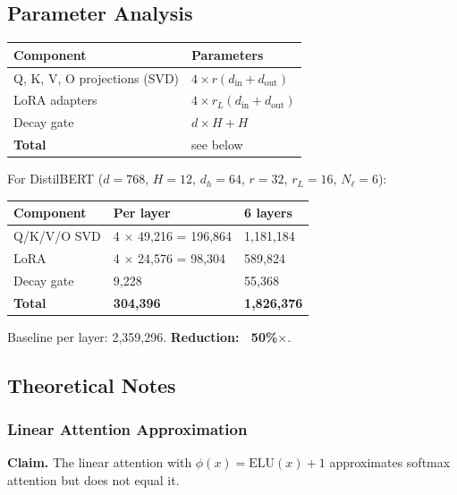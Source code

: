 \subsection{Parameter Analysis}

\begin{table}[H]
\centering
\small
\begin{tabular}{ll}
\toprule
\textbf{Component} & \textbf{Parameters} \\
\midrule
Q, K, V, O projections (SVD) & $4 \times r(d_\text{in} + d_\text{out})$ \\
LoRA adapters & $4 \times r_L(d_\text{in} + d_\text{out})$ \\
Decay gate & $d \times H + H$ \\
\textbf{Total} & see below \\
\bottomrule
\end{tabular}
\end{table}

For DistilBERT ($d = 768$, $H = 12$, $d_h = 64$, $r = 32$, $r_L = 16$, $N_\ell = 6$):

\begin{table}[H]
\centering
\small
\begin{tabular}{lll}
\toprule
\textbf{Component} & \textbf{Per layer} & \textbf{6 layers} \\
\midrule
Q/K/V/O SVD & 4 $\times$ 49,216 = 196,864 & 1,181,184 \\
LoRA & 4 $\times$ 24,576 = 98,304 & 589,824 \\
Decay gate & 9,228 & 55,368 \\
\textbf{Total} & \textbf{304,396} & \textbf{1,826,376} \\
\bottomrule
\end{tabular}
\end{table}

Baseline per layer: 2,359,296. \textbf{Reduction: ~50\%$\times$}.

\subsection{Theoretical Notes}

\subsubsection{Linear Attention Approximation}

\textbf{Claim.} The linear attention with $\phi(x) = \text{ELU}(x) + 1$ approximates 
softmax attention but does not equal it.

